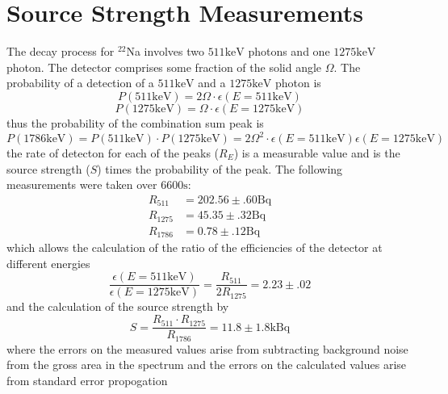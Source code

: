 \documentclass[12pt, a4paper]{article}
\begin{document}
\section{Source Strength Measurements}
	The decay process for $^{22}$Na involves two $511\unit{\keV}$ photons and one $1275\unit{\keV}$ photon. The detector comprises some fraction of the solid angle $\Omega$. The probability of a detection of a $511\unit{\keV}$ and a $1275\unit{\keV}$ photon is
	\begin{equation}
		P(511\unit{\keV}) = 2\Omega\cdot\epsilon(E=511\unit{\keV})
	\end{equation}
	\begin{equation}
		P(1275\unit{\keV}) = \Omega\cdot\epsilon(E=1275\unit{\keV})
	\end{equation}
	thus the probability of the combination sum peak is
	\begin{equation}
		P(1786\unit{\keV}) = P(511\unit{\keV})\cdot P(1275\unit{\keV}) = 2\Omega^2\cdot\epsilon(E=511\unit{\keV})\epsilon(E=1275\unit{\keV})
	\end{equation}
	the rate of detecton for each of the peaks ($R_E$) is a measurable value and is the source strength ($S$) times the probability of the peak. The following measurements were taken over $6600\unit{\s}$:
	\begin{align}
		R_{511} &= 202.56\pm.60\unit{\becquerel}\\
		R_{1275} &= 45.35\pm.32\unit{\becquerel}\\
		R_{1786} &= 0.78\pm.12\unit{\becquerel}
	\end{align}
	which allows the calculation of the ratio of the efficiencies of the detector at different energies
	\begin{equation}
		\frac{\epsilon(E=511\unit{\keV})}{\epsilon(E=1275\unit{\keV})} = \frac{R_{511}}{2R_{1275}} = 2.23\pm.02
	\end{equation}
	and the calculation of the source strength by
	\begin{equation}
		S = \frac{R_{511}\cdot R_{1275}}{R_{1786}} = 11.8\pm1.8\unit{\kilo\becquerel}
	\end{equation}
	where the errors on the measured values arise from subtracting background noise from the gross area in the spectrum and the errors on the calculated values arise from standard error propogation
\end{document}
